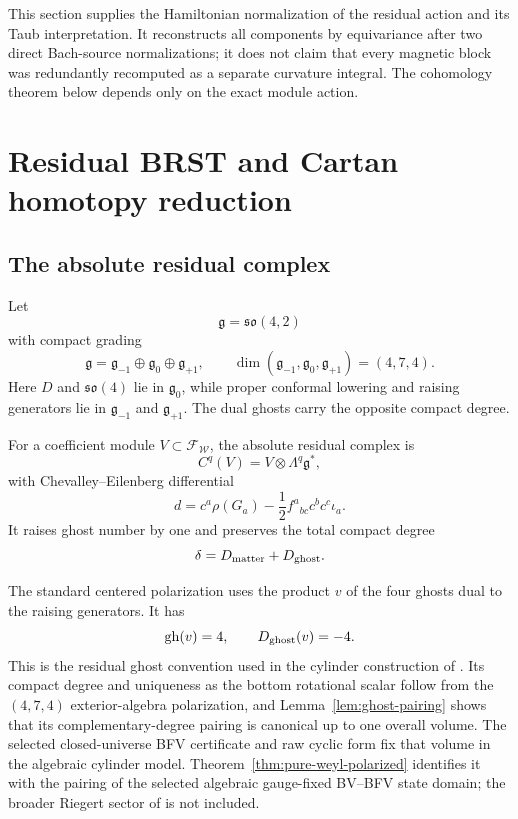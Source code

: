 \documentclass[11pt]{article}
\theoremstyle{definition}
\theoremstyle{remark}
\newcommand{\g}{\mathfrak g}
\newcommand{\W}{\mathcal W}
\newcommand{\F}{\mathcal F}
\begin{document}
This section supplies the Hamiltonian normalization of the residual action
and its Taub interpretation.  It reconstructs all components by equivariance
after two direct Bach-source normalizations; it does not claim that every
magnetic block was redundantly recomputed as a separate curvature integral.
The cohomology theorem below depends only on the exact module action.

\section{Residual BRST and Cartan homotopy reduction}\label{sec:cartan}

\subsection{The absolute residual complex}

Let
\begin{equation}
 \g=\mathfrak{so}(4,2)
\end{equation}
with compact grading
\begin{equation}\label{eq:g-grading}
 \g=\g_{-1}\oplus\g_0\oplus\g_{+1},
 \qquad \dim(\g_{-1},\g_0,\g_{+1})=(4,7,4).
\end{equation}
Here $D$ and $\mathfrak{so}(4)$ lie in $\g_0$, while proper conformal
lowering and raising generators lie in $\g_{-1}$ and $\g_{+1}$.
The dual ghosts carry the opposite compact degree.

For a coefficient module $V\subset\F_{\W}$, the absolute residual complex
is
\begin{equation}\label{eq:CE-complex}
 C^q(V)=V\otimes\Lambda^q\g^*,
\end{equation}
with Chevalley--Eilenberg differential
\begin{equation}\label{eq:CE-differential}
 d=c^a\rho(G_a)
 -\frac12 f^a{}_{bc}c^bc^c\iota_a.
\end{equation}
It raises ghost number by one and preserves the total compact degree
\begin{equation}\label{eq:total-degree}
 \delta=D_{\rm matter}+D_{\rm ghost}.
\end{equation}

The standard centered polarization uses the product $v$ of the four ghosts
dual to the raising generators.  It has
\begin{equation}\label{eq:ghost-vacuum-degree}
 \operatorname{gh}(v)=4,
 \qquad D_{\rm ghost}(v)=-4.
\end{equation}
This is the residual ghost convention used in the cylinder construction of
\cite{HamadaBRST}.  Its compact degree and uniqueness as the bottom
rotational scalar follow from the $(4,7,4)$ exterior-algebra polarization,
and Lemma~\ref{lem:ghost-pairing} shows that its complementary-degree pairing
is canonical up to one overall volume.  The selected closed-universe BFV
certificate and raw cyclic form fix that volume in the algebraic cylinder
model.  Theorem~\ref{thm:pure-weyl-polarized} identifies it with the pairing
of the selected algebraic gauge-fixed BV--BFV state domain; the broader
Riegert sector of \cite{HamadaBRST} is not included.
\end{document}
